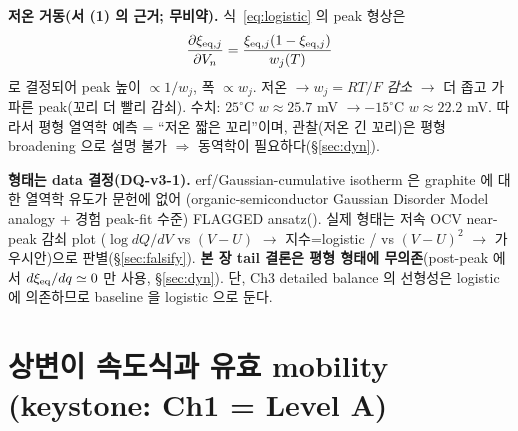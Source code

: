\textbf{저온 거동(서 (1) 의 근거; 무비약).} 식~\eqref{eq:logistic} 의 peak 형상은
\begin{equation}
\frac{\partial\xi_{\mathrm{eq},j}}{\partial V_n}=\frac{\xi_{\mathrm{eq},j}(1-\xi_{\mathrm{eq},j})}{w_j(T)}
\label{eq:dxidV}
\end{equation}
로 결정되어 peak 높이 $\propto 1/w_j$, 폭 $\propto w_j$. 저온 $\to w_j=RT/F$ \emph{감소} $\to$ 더 좁고
가파른 peak(꼬리 더 빨리 감쇠). 수치: $25^\circ$C $w\approx25.7$ mV $\to -15^\circ$C $w\approx22.2$ mV.
따라서 평형 열역학 예측 = ``저온 짧은 꼬리''이며, 관찰(저온 긴 꼬리)은 평형 broadening 으로 설명
불가 $\Rightarrow$ 동역학이 필요하다(\S\ref{sec:dyn}).
\begin{flagbox}
\textbf{형태는 data 결정(DQ-v3-1).} erf/Gaussian-cumulative isotherm 은 graphite 에 대한 열역학 유도가
문헌에 없어 (organic-semiconductor Gaussian Disorder Model \cite{baessler1993} analogy + 경험
peak-fit 수준) FLAGGED ansatz(). 실제 형태는 저속 OCV near-peak 감쇠 plot
($\log dQ/dV$ vs $(V-U)$ $\to$ 지수=logistic / vs $(V-U)^2$ $\to$ 가우시안)으로 판별(\S\ref{sec:falsify}).
\textbf{본 장 tail 결론은 평형 형태에 무의존}(post-peak 에서 $d\xi_{\mathrm{eq}}/dq\simeq0$ 만 사용,
\S\ref{sec:dyn}). 단, Ch3 detailed balance 의 선형성은 logistic 에 의존하므로 baseline 을 logistic 으로 둔다.
\end{flagbox}

\section{상변이 속도식과 유효 mobility (keystone: Ch1 = Level A)}\label{sec:rate}
